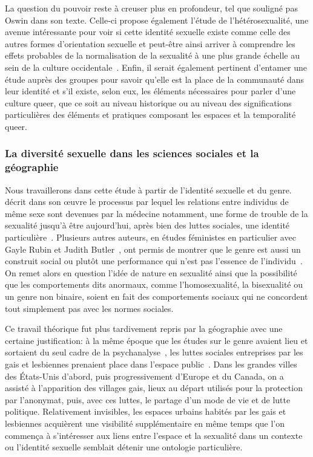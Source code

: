 La question du pouvoir reste à creuser plus en profondeur, tel que souligné pas Oswin dans son texte. 
Celle-ci propose également l'étude de l'hétérosexualité, une avenue intéressante pour voir si cette identité sexuelle existe comme celle des autres formes d'orientation sexuelle et peut-être ainsi arriver à comprendre les effets probables de la normalisation de la sexualité à une plus grande échelle au sein de la culture occidentale~\citep[100]{Oswin2008}. 
Enfin, il serait également pertinent d’entamer une étude auprès des groupes \lgbt{} pour savoir qu'elle est la place de la communauté dans leur identité et s'il existe, selon eux, les éléments nécessaires pour parler d'une culture queer, que ce soit au niveau historique ou au niveau des significations particulières des éléments et pratiques composant les espaces et la temporalité queer.

\subsubsection{La diversité sexuelle dans les sciences sociales et la
géographie}
\label{ssub:la_diversit_sexuelle_dans_les_sciences_sociales_et_la_g_ographie}
Nous travaillerons dans cette étude à partir de l'identité sexuelle et du genre.
\citet{Foucault2011} décrit dans son œuvre  le processus par lequel les relations entre individus de même sexe sont devenues par la médecine notamment, une forme de trouble de la sexualité jusqu'à être aujourd'hui, après bien des luttes sociales, une identité particulière~\citep{Foucault2011}. 
Plusieurs autres auteurs, en études féministes en particulier avec Gayle Rubin et Judith Butler~\citep[98]{Marcus2005}, ont permis de montrer que le genre est aussi un construit social ou plutôt une performance qui n'est pas l'essence de l'individu~\citep{Butler2007}. 
On remet alors en question l'idée de nature en sexualité ainsi que la possibilité que les comportements dits anormaux, comme l'homosexualité, la bisexualité ou un genre non binaire, soient en fait des comportements sociaux qui ne concordent tout simplement pas avec les normes sociales.

Ce travail théorique fut plus tardivement repris par la géographie avec une certaine justification: à la même époque que les études sur le genre avaient lieu et sortaient du seul cadre de la psychanalyse~\citep{Rubin2011a,Rubin2011}, les luttes sociales entreprises par les gais et lesbiennes prenaient place dans l'espace public~\citep[422-427]{Spencer2005}. 
Dans les grandes villes des États-Unis d'abord, puis progressivement d'Europe et du Canada, on a assisté à l'apparition des villages gais, lieux au départ utilisés pour la protection par l'anonymat, puis, avec ces luttes, le partage d'un mode de vie et de lutte politique. 
Relativement invisibles, les espaces urbains habités par les gais et lesbiennes acquièrent une visibilité supplémentaire en même temps que l'on commença à s'intéresser aux liens entre l'espace et la sexualité dans un contexte ou l'identité sexuelle semblait détenir une ontologie particulière.

